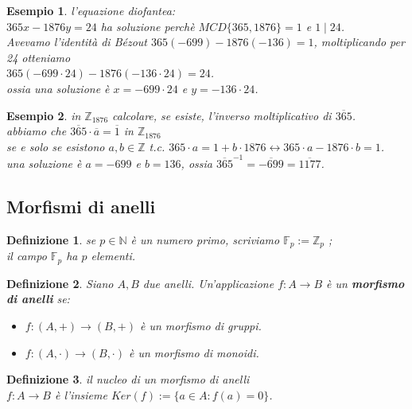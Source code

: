 \documentclass[a4paper,12pt]{article}
\theoremstyle{def}
\newtheorem*{definition}{Definizione}
\theoremstyle{prop}
\theoremstyle{esempio}
\newtheorem*{example}{Esempio}
\theoremstyle{dimostrazione}
\theoremstyle{teo}
\theoremstyle{osservazione}
\begin{document}
\begin{example}
	l'equazione diofantea:\\
	\(365x - 1876y = 24\) ha soluzione perchè \(MCD \{365,1876\} = 1\) e \(1 \mid 24\).\\
	Avevamo l'identità di Bézout \(365(-699) - 1876(-136) = 1\), moltiplicando per 24 otteniamo\\
	\(365(-699 \cdot 24) - 1876(-136 \cdot 24) = 24\).\\
	ossia una soluzione è \(x = -699 \cdot 24\) e \(y = -136 \cdot 24\).
\end{example}

\begin{example}
	in \(\mathbb{Z}_{1876}\) calcolare, se esiste, l'inverso moltiplicativo di \(\overline{365}\).\\
	abbiamo che \(\overline{365} \cdot \overline{a} = \overline{1}\) in \(\mathbb{Z}_{1876}\)\\
	se e solo se esistono \(a,b \in \mathbb{Z}\) t.c. \(365 \cdot a = 1 + b \cdot 1876 \leftrightarrow 365 \cdot a - 1876 \cdot b = 1\).\\
	una soluzione è \(a = -699\) e \(b = 136\), ossia \(\overline{365}^{-1} = \overline{-699} = \overline{1177}\).
\end{example}
\newpage

\subsection{Morfismi di anelli}

\begin{definition}
	se \(p \in \mathbb{N}\) è un numero primo, scriviamo \(\mathbb{F}_p := \mathbb{Z}_p\) ;\\
	il campo \(\mathbb{F}_p\) ha \(p\) elementi.
\end{definition}

\begin{definition}
	Siano \(A,B\) due anelli. Un'applicazione \(f : A \rightarrow B\) è un \textbf{morfismo di anelli} se:
	\
	\begin{itemize}
		\item \(f: (A,+) \rightarrow (B,+)\) è un morfismo di gruppi.
		\item \(f: (A,\cdot) \rightarrow (B,\cdot)\) è un morfismo di monoidi.
	\end{itemize}
\end{definition}

\begin{definition}
	il nucleo di un morfismo di anelli\\
	\(f : A \rightarrow B\) è l'insieme \(Ker(f):=\{a \in A : f(a) = 0\}\).\\
\end{definition}
\end{document}
